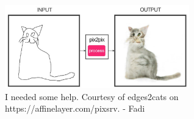 \begin{centering}
\begin{figure}\centering
  \includegraphics[width=8cm]{cat-fadiwassaf.pdf}
  \caption{I needed some help. Courtesy of edges2cats on https://affinelayer.com/pixsrv. - Fadi}
  \label{cat-fadi}
\end{figure}
\end{centering}

\clearpage
